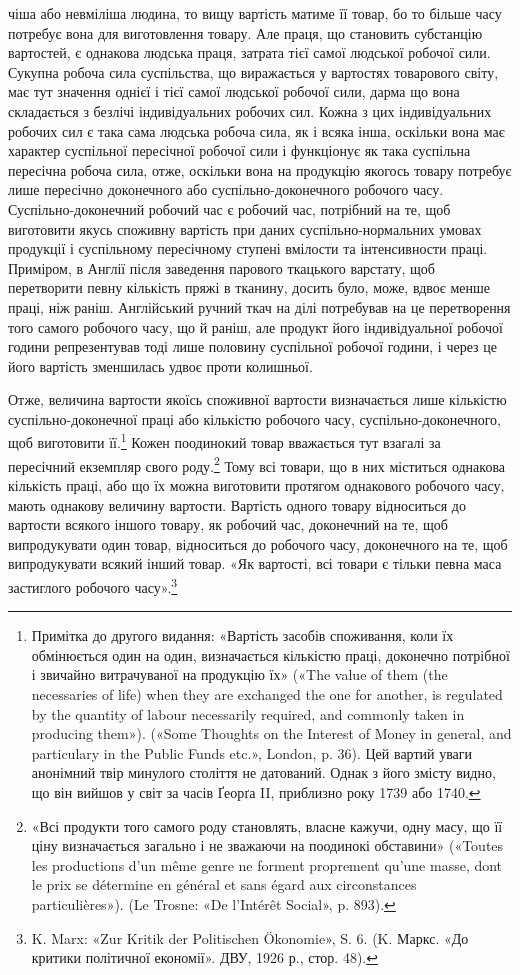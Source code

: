 чіша або невміліша людина, то вищу вартість матиме її товар,
бо то більше часу потребує вона для виготовлення товару. Але
праця, що становить субстанцію вартостей, є однакова людська
праця, затрата тієї самої людської робочої сили. Сукупна робоча
сила суспільства, що виражається у вартостях товарового світу,
має тут значення однієї і тієї самої людської робочої сили, дарма
що вона складається з безлічі індивідуальних робочих сил. Кожна
з цих індивідуальних робочих сил є така сама людська робоча
сила, як і всяка інша, оскільки вона має характер суспільної
пересічної робочої сили і функціонує як така суспільна пересічна
робоча сила, отже, оскільки вона на продукцію якогось товару
потребує лише пересічно доконечного або суспільно-доконечного
робочого часу. Суспільно-доконечний робочий час є робочий
час, потрібний на те, щоб виготовити якусь споживну вартість
при даних суспільно-нормальних умовах продукції і суспільному
пересічному ступені вмілости та інтенсивности праці. Приміром,
в Англії після заведення парового ткацького варстату,
щоб перетворити певну кількість пряжі в тканину, досить було,
може, вдвоє менше праці, ніж раніш. Англійський ручний ткач
на ділі потребував на це перетворення того самого робочого часу,
що й раніш, але продукт його індивідуальної робочої години
репрезентував тоді лише половину суспільної робочої години, і
через це його вартість зменшилась удвоє проти колишньої.

Отже, величина вартости якоїсь споживної вартости визначається
лише кількістю суспільно-доконечної праці або кількістю
робочого часу, суспільно-доконечного, щоб виготовити
її.\footnote{
Примітка до другого видання: «Вартість засобів споживання, коли
їх обмінюється один на один, визначається кількістю праці, доконечно потрібної
і звичайно витрачуваної на продукцію їх» («The value of them
(the necessaries of life) when they are exchanged the one for another, is
regulated by the quantity of labour necessarily required, and commonly
taken in producing them»). («Some Thoughts on the Interest of Money in
general, and particulary in the Public Funds etc.», London, p. 36). Цей
вартий уваги анонімний твір минулого століття не датований. Однак
з його змісту видно, що він вийшов у світ за часів Ґеорґа II, приблизно
року 1739 або 1740.
} Кожен поодинокий товар вважається тут взагалі за пересічний
екземпляр свого роду.\footnote{
«Всі продукти того самого роду становлять, власне кажучи, одну
масу, що її ціну визначається загально і не зважаючи на поодинокі обставини»
(«Toutes les productions d’un même genre ne forment proprement
qu’une masse, dont le prix se détermine en général et sans égard aux circonstances
particulières»). (Le Trosne: «De l’Intérêt Social», p. 893).
} Тому всі товари, що в них міститься
однакова кількість праці, або що їх можна виготовити протягом
однакового робочого часу, мають однакову величину вартости.
Вартість одного товару відноситься до вартости всякого іншого
товару, як робочий час, доконечний на те, щоб випродукувати
один товар, відноситься до робочого часу, доконечного на те,
щоб випродукувати всякий інший товар. «Як вартості, всі товари
є тільки певна маса застиглого робочого часу».\footnote{
K. Marx: «Zur Kritik der Politischen Ökonomie», S. 6. (K. Маркс.
«До критики політичної економії». ДВУ, 1926 р., стор. 48).
}